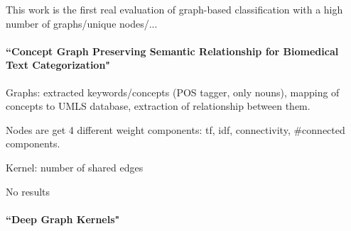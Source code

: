 This work is the first real evaluation of graph-based classification with a high number of graphs/unique nodes/...


\paragraph{``Concept Graph Preserving Semantic Relationship for Biomedical Text Categorization" \cite{Gulrandhe2015}}
Graphs: extracted keywords/concepts (POS tagger, only nouns), mapping of concepts to UMLS database, extraction of relationship between them.

Nodes are get 4 different weight components: tf, idf, connectivity, #connected components.

Kernel: number of shared edges

No results

\paragraph{``Deep Graph Kernels" \cite{Yanardag2015}}
